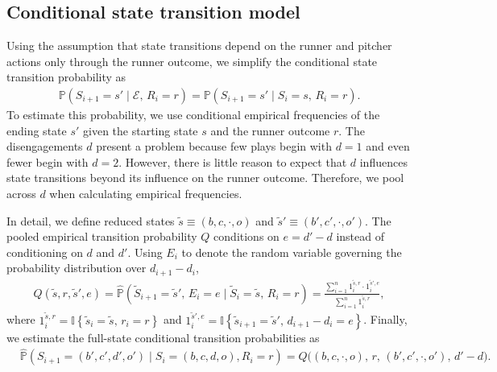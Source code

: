 \documentclass[aoas]{imsart}
\begin{document}
    \subsection{Conditional state transition model}
    \label{sec:prob-state-transition}

      Using the assumption that state transitions depend on the runner and pitcher actions only through the runner outcome, we simplify the conditional state transition probability as
      \begin{align}
        \mathbb{P}(S_{i+1} = s' \mid \mathcal{E},\, R_i = r) =
          \mathbb{P}(S_{i+1} = s' \mid S_i = s,\, R_i = r).
      \end{align}
      To estimate this probability, we use conditional empirical frequencies of the ending state $s'$ given the starting state $s$ and the runner outcome $r$. The disengagements $d$ present a problem because few plays begin with $d = 1$ and even fewer begin with $d = 2$. However, there is little reason to expect that $d$ influences state transitions beyond its influence on the runner outcome. Therefore, we pool across $d$ when calculating empirical frequencies.
      
      In detail, we define reduced states $\tilde s \equiv (b, c, \cdot, o)$ and $\tilde s' \equiv (b', c', \cdot, o')$. The pooled empirical transition probability $Q$ conditions on $e = d' - d$ instead of conditioning on $d$ and $d'$. Using $E_{i}$ to denote the random variable governing the probability distribution over $d_{i + 1} - d_i$,
      \begin{align}
        \label{eqn:pooled-probabilities}
          Q(\tilde s, r, \tilde s', e)
            = \hat{\mathbb{P}}\left(\tilde S_{i+1} =   \tilde s',\, E_i = e \mid \tilde S_i = \tilde s,\, R_i = r\right)
            = \frac
              {\sum_{i=1}^n 1_i^{\tilde s, r} \cdot 1_i^{\tilde s', e}}
              {\sum_{i=1}^n 1_i^{\tilde s, r}},
      \end{align}
      where $1_i^{\tilde s, r} = \mathbb{I}\left\{\tilde s_i = \tilde s,\, r_i = r\right\}$ and $1_i^{\tilde s', e}= \mathbb{I}\left\{\tilde s_{i+1} = \tilde s',\, d_{i+1} - d_i = e\right\}$. Finally, we estimate the full-state conditional transition probabilities as
      \begin{align*}
        &\hat{\mathbb{P}}(S_{i+1} = (b', c', d', o') \mid S_i = (b, c, d, o), R_i = r) = Q\big((b, c, \cdot, o),\, r,\, (b', c', \cdot, o'),\, d' - d\big).
      \end{align*}
  
\end{document}
